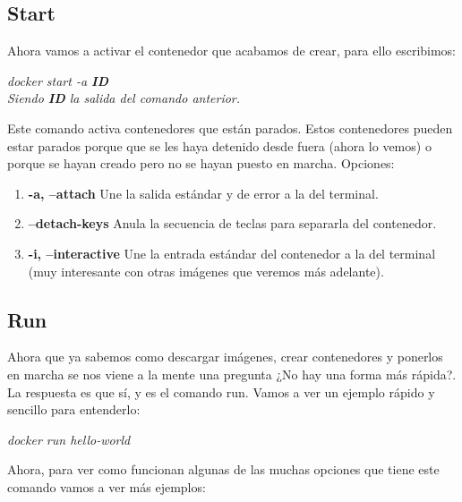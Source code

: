 \documentclass[]{article}
\begin{document}
\subsection{Start}

Ahora vamos a activar el contenedor que acabamos de crear, para ello escribimos:

\begin{center}
	
	\it docker start -a {\bf ID}
	\\ Siendo {\bf ID} la salida del comando anterior.
\end{center}

Este comando activa contenedores que están parados.
Estos contenedores pueden estar parados porque que se les haya detenido desde fuera (ahora lo vemos) o porque se hayan creado pero no se hayan puesto en marcha.
Opciones:

\begin{enumerate}

\renewcommand{\labelenumi}{$ \bullet $}

	\item {\bf -a, --attach} Une la salida estándar y de error a la del terminal.
	
	\item {\bf--detach-keys} Anula la secuencia de teclas para separarla del contenedor.
	
	\item {\bf-i, --interactive} Une la entrada estándar del contenedor a la del terminal (muy interesante con otras imágenes que veremos más adelante). 

\end{enumerate}


\subsection{Run}

Ahora que ya sabemos como descargar imágenes, crear contenedores y ponerlos en marcha se nos viene a la mente una pregunta ¿No hay una forma más rápida?.
La respuesta es que sí, y es el comando run.
Vamos a ver un ejemplo rápido y sencillo para entenderlo:

\begin{center}

	\it docker run hello-world

\end{center}

Ahora, para ver como funcionan algunas de las muchas opciones que tiene este comando vamos a ver más ejemplos:
\end{document}
